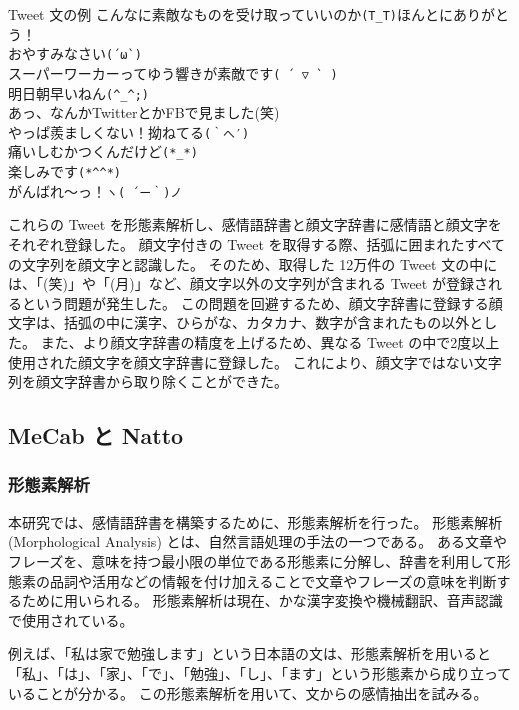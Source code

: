\documentclass[11pt,a4j]{jsarticle}
\begin{document}
\begin{itembox}[c]{Tweet 文の例}
  こんなに素敵なものを受け取っていいのか\verb|(T_T)|ほんとにありがとう！\\
  おやすみなさい\verb|(´ω`)| \\
  スーパーワーカーってゆう響きが素敵です\verb|( ´ ▽ ` )| \\
  明日朝早いねん\verb|(^_^;)| \\
  あっ、なんかTwitterとかFBで見ました(笑)\\
  やっぱ羨ましくない！拗ねてる\verb|(｀へ′)| \\
  痛いしむかつくんだけど\verb|(*_*)| \\
  楽しみです\verb|(*^^*)| \\
  がんばれ〜っ！\verb|ヽ( ´ー｀)ノ|\\
\end{itembox}

これらの Tweet を形態素解析し、感情語辞書と顔文字辞書に感情語と顔文字をそれぞれ登録した。
顔文字付きの Tweet を取得する際、括弧に囲まれたすべての文字列を顔文字と認識した。
そのため、取得した 12万件の Tweet 文の中には、「(笑)」や「(月)」など、顔文字以外の文字列が含まれる Tweet が登録されるという問題が発生した。
この問題を回避するため、顔文字辞書に登録する顔文字は、括弧の中に漢字、ひらがな、カタカナ、数字が含まれたもの以外とした。
また、より顔文字辞書の精度を上げるため、異なる Tweet の中で2度以上使用された顔文字を顔文字辞書に登録した。
これにより、顔文字ではない文字列を顔文字辞書から取り除くことができた。


\subsection{MeCab と Natto}
\subsubsection{形態素解析}
本研究では、感情語辞書を構築するために、形態素解析を行った。
形態素解析 (Morphological Analysis) とは、自然言語処理の手法の一つである。
ある文章やフレーズを、意味を持つ最小限の単位である形態素に分解し、辞書を利用して形態素の品詞や活用などの情報を付け加えることで文章やフレーズの意味を判断するために用いられる。
形態素解析は現在、かな漢字変換や機械翻訳、音声認識で使用されている。

例えば、「私は家で勉強します」という日本語の文は、形態素解析を用いると「私」、「は」、「家」、「で」、「勉強」、「し」、「ます」という形態素から成り立っていることが分かる。
この形態素解析を用いて、文からの感情抽出を試みる。
\end{document}

